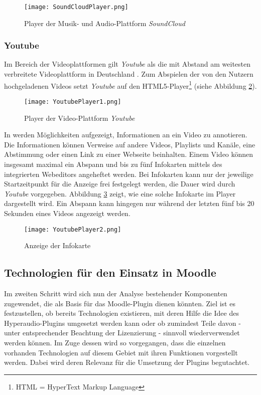 \begin{figure}[h!]
\texttt{[image: SoundCloudPlayer.png]}
\caption{\label{fig:SoundCloudPlayer}Player der Musik- und Audio-Plattform \textit{SoundCloud} \citep{SoundCloud2015Panic}}
\end{figure}

\subsubsection{Youtube}
 
Im Bereich der Videoplattformen gilt \textit{Youtube} als die mit Abstand am weitesten verbreitete Videoplattform in Deutschland \citep{statista2016video}.  Zum Abspielen der von den Nutzern hochgeladenen Videos setzt \textit{Youtube} auf den HTML5-Player\footnote{HTML = HyperText Markup Language} (siehe Abbildung \ref{fig:YoutubePlayer1}).

\begin{figure}[h!]
\texttt{[image: YoutubePlayer1.png]}
\caption{\label{fig:YoutubePlayer1}Player der Video-Plattform \textit{Youtube} \citep{Youtube2015Panic}}
\end{figure}

In \citep{youtubeinfokarten,youtubeabspann} werden Möglichkeiten aufgezeigt, Informationen an ein Video zu annotieren. Die Informationen können Verweise auf andere Videos, Playlists und Kanäle, eine Abstimmung oder einen Link zu einer Webseite beinhalten. Einem Video können insgesamt maximal ein Abspann und bis zu fünf Infokarten mittels des integrierten Webeditors angeheftet werden. Bei Infokarten kann nur der jeweilige Startzeitpunkt für die Anzeige frei festgelegt werden, die Dauer wird durch \textit{Youtube} vorgegeben. Abbildung \ref{fig:YoutubePlayer2} zeigt, wie eine solche Infokarte im Player dargestellt wird. Ein Abspann kann hingegen nur während der letzten fünf bis 20 Sekunden eines Videos angezeigt werden.


\begin{figure}[h!]
\texttt{[image: YoutubePlayer2.png]}
\caption{\label{fig:YoutubePlayer2}Anzeige der Infokarte \citep{Youtube2015Panic}}
\end{figure}


\subsection{Technologien für den Einsatz in Moodle}
Im zweiten Schritt wird sich nun der Analyse bestehender Komponenten zugewendet, die als Basis für das Moodle-Plugin dienen könnten. Ziel ist es festzustellen, ob bereits Technologien existieren, mit deren Hilfe die Idee des Hyperaudio-Plugins umgesetzt werden kann oder ob zumindest Teile davon - unter entsprechender Beachtung der Lizenzierung - sinnvoll wiederverwendet werden können. Im Zuge dessen wird so vorgegangen, dass die einzelnen vorhanden Technologien auf diesem Gebiet mit ihren Funktionen vorgestellt werden. Dabei wird deren Relevanz für die Umsetzung der Plugins begutachtet.

